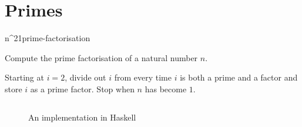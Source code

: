 \documentclass[main.tex]{subfiles}
\begin{document}
\chapter{Primes}

\begin{libraryfile}
  \begin{algorithm}{n^2}{1}{prime-factorisation}
    \begin{algorithm-description}
        Compute the prime factorisation of a natural number $n$.
    \end{algorithm-description}

    \begin{algorithm-explanation}
      Starting at $i=2$, divide out $i$ from every time $i$ is both a prime and a factor and store $i$ as a prime factor.
      Stop when $n$ has become $1$.
      \begin{figure}[H]
        \centering
        \inputminted[firstline=14, lastline=21]{haskell}{\lib{haskell}{Primes.hs}}
        \caption{An implementation in Haskell}
      \end{figure}
    \end{algorithm-explanation}
  \end{algorithm}
\end{libraryfile}
\end{document}
